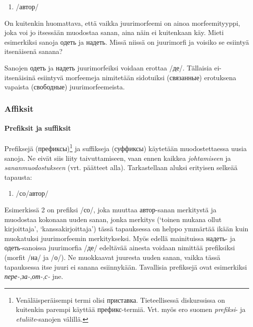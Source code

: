 \documentclass[]{scrartcl}
\begin{document}
\begin{enumerate}
\def\labelenumi{(\arabic{enumi})}
\itemsep1pt\parskip0pt
\item
  /автор/
\end{enumerate}

On kuitenkin huomattava, että vaikka juurimorfeemi on ainoa
morfeemityyppi, joka voi jo itsessään muodostaa sanan, aina näin ei
kuitenkaan käy. Mieti esimerkiksi sanoja одеть ja надеть. Missä niissä
on juurimorfi ja voisiko se esiintyä itsenäisenä sanana?

Sanojen одеть ja надеть juurimorfeiksi voidaan erottaa /де/. Tällaisia
ei-itsenäisinä esiintyvä morfeemeja nimitetään sidotuiksi (связанные)
erotuksena vapaista (свободные) juurimorfeemeista.

\subsubsection{Affiksit}\label{affiksit}

\paragraph{Prefiksit ja suffiksit}\label{prefiksit-ja-suffiksit}

Prefiksejä (префиксы)\footnote{Venäläisperäisempi termi olisi приставка.
  Tieteellisessä diskurssissa on kuitenkin parempi käyttää
  префикс-termiä. Vrt. myös ero suomen \emph{prefiksi}- ja
  \emph{etuliite}-sanojen välillä.} ja suffikseja (суффиксы) käytetään
muodostettaessa uusia sanoja. Ne eivät siis liity taivuttamiseen, vaan
ennen kaikkea \emph{johtamiseen} ja \emph{sananmuodostukseen} (vrt.
päätteet alla). Tarkastellaan aluksi erityisen selkeää tapausta:

\begin{enumerate}
\def\labelenumi{(\arabic{enumi})}
\setcounter{enumi}{1}
\itemsep1pt\parskip0pt
\item
  /со/автор/
\end{enumerate}

Esimerkissä 2 on prefiksi /со/, joka muuttaa автор-sanan merkitystä ja
muodostaa kokonaan uuden sanan, jonka merkitys (`toinen mukana ollut
kirjoittaja', `kanssakirjoittaja') tässä tapauksessa on helppo ymmärtää
ikään kuin muokatuksi juurimorfeemin merkitykseksi. Myös edellä
mainituissa надеть- ja одеть-sanoissa juurimorfia /де/ edeltävää ainesta
voidaan nimittää prefiksiksi (morfit /на/ ja /о/). Ne muokkaavat
juuresta uuden sanan, vaikka tässä tapauksessa itse juuri ei sanana
esiinnykään. Tavallisia prefiksejä ovat esimerkiksi
\emph{пере-},\emph{за-},\emph{от-},\emph{с-} jne.
\end{document}
